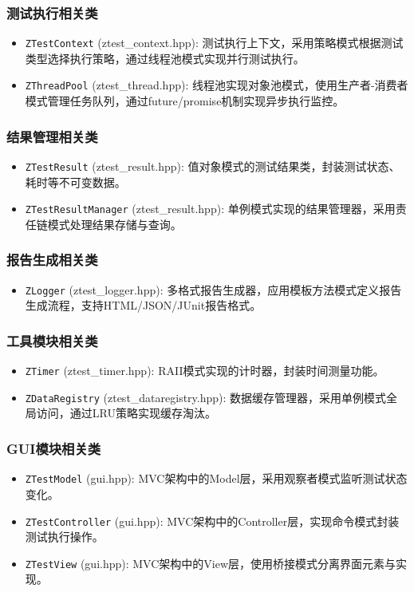 \documentclass{article}
\begin{document}
\subsubsection{测试执行相关类}
\begin{itemize}
    \item \texttt{ZTestContext} (ztest\_context.hpp): 测试执行上下文，采用策略模式根据测试类型选择执行策略，通过线程池模式实现并行测试执行。
    \item \texttt{ZThreadPool} (ztest\_thread.hpp): 线程池实现对象池模式，使用生产者-消费者模式管理任务队列，通过future/promise机制实现异步执行监控。
\end{itemize}

\subsubsection{结果管理相关类}
\begin{itemize}
    \item \texttt{ZTestResult} (ztest\_result.hpp): 值对象模式的测试结果类，封装测试状态、耗时等不可变数据。
    \item \texttt{ZTestResultManager} (ztest\_result.hpp): 单例模式实现的结果管理器，采用责任链模式处理结果存储与查询。
\end{itemize}

\subsubsection{报告生成相关类}
\begin{itemize}
    \item \texttt{ZLogger} (ztest\_logger.hpp): 多格式报告生成器，应用模板方法模式定义报告生成流程，支持HTML/JSON/JUnit报告格式。
\end{itemize}

\subsubsection{工具模块相关类}
\begin{itemize}
    \item \texttt{ZTimer} (ztest\_timer.hpp): RAII模式实现的计时器，封装时间测量功能。
    \item \texttt{ZDataRegistry} (ztest\_dataregistry.hpp): 数据缓存管理器，采用单例模式全局访问，通过LRU策略实现缓存淘汰。
\end{itemize}

\subsubsection{GUI模块相关类}
\begin{itemize}
    \item \texttt{ZTestModel} (gui.hpp): MVC架构中的Model层，采用观察者模式监听测试状态变化。
    \item \texttt{ZTestController} (gui.hpp): MVC架构中的Controller层，实现命令模式封装测试执行操作。
    \item \texttt{ZTestView} (gui.hpp): MVC架构中的View层，使用桥接模式分离界面元素与实现。
\end{itemize}
\end{document}
